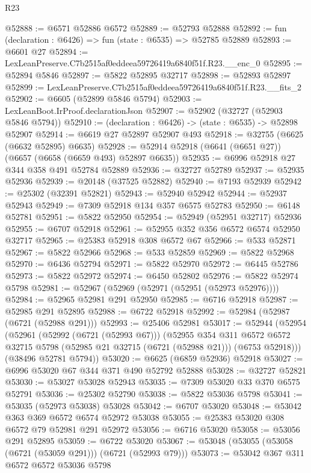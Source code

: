 \begin{lexlean}{R23}
\begin{coremodule}
@52888 := @6571 @52886 @6572
@52889 := @52793 @52888
@52892 := fun (declaration : @6426) => fun (state : @6535) => @52785 @52889
@52893 := @6601 @27
@52894 := LexLeanPreserve.C7b2515af0eddeea59726419a6840f51f.R23.__enc_0
@52895 := @52894 @5846
@52897 := @5822 @52895 @32717
@52898 := @52893 @52897
@52899 := LexLeanPreserve.C7b2515af0eddeea59726419a6840f51f.R23.__fits_2
@52902 := @6605 (@52899 @5846 @5794)
@52903 := LexLeanBoot.IrProof.declarationJson
@52907 := @52902 (@32727 (@52903 @5846 @5794))
@52910 := (declaration : @6426) -> (state : @6535) -> @52898 @52907
@52914 := @6619 @27 @52897 @52907 @493
@52918 := @32755 (@6625 (@6632 @52895) @6635)
@52928 := @52914 @52918 (@6641 (@6651 @27)) (@6657 (@6658 (@6659 @493) @52897 @6635))
@52935 := @6996 @52918 @27 @344 @358 @491 @52784 @52889
@52936 := @32727 @52789
@52937 := @52935 @52936
@52939 := @20148 (@37525 @52882)
@52940 := @7193 @52939
@52942 := @25302 (@32391 @52821)
@52943 := @52940 @52942
@52944 := @52937 @52943
@52949 := @7309 @52918 @134 @357 @6575 @52783
@52950 := @6148 @52781
@52951 := @5822 @52950
@52954 := @52949 (@52951 @32717) @52936
@52955 := @6707 @52918
@52961 := @52955 @352 @356 @6572 @6574 @52950 @32717
@52965 := @25383 @52918 @308 @6572 @67
@52966 := @533 @52871
@52967 := @5822 @52966
@52968 := @533 @52859
@52969 := @5822 @52968
@52970 := @6436 @52794
@52971 := @5822 @52970
@52972 := @6445 @52786
@52973 := @5822 @52972
@52974 := @6450 @52802
@52976 := @5822 @52974 @5798
@52981 := @52967 (@52969 (@52971 (@52951 (@52973 @52976))))
@52984 := @52965 @52981 @291 @52950
@52985 := @6716 @52918
@52987 := @52985 @291 @52895
@52988 := @6722 @52918
@52992 := @52984 (@52987 (@6721 (@52988 @291)))
@52993 := @25406 @52981
@53017 := @52944
    (@52954
      (@52961
        (@52992 (@6721 (@52993 @67)))
        (@52955
          @354
          @311
          @6572
          @6572
          @32715
          @5798
          (@52985 @21 @32715 (@6721 (@52988 @21)))
          (@6753 @52918)))
      (@38496 @52781 @5794))
@53020 := @6625 (@6859 @52936) @52918
@53027 := @6996 @53020 @67 @344 @371 @490 @52792 @52888
@53028 := @32727 @52821
@53030 := @53027 @53028 @52943
@53035 := @7309 @53020 @33 @370 @6575 @52791
@53036 := @25302 @52790
@53038 := @5822 @53036 @5798
@53041 := @53035 (@52973 @53038) @53028
@53042 := @6707 @53020
@53048 := @53042 @363 @369 @6572 @6574 @52972 @53038
@53055 := @25383 @53020 @308 @6572 @79 @52981 @291 @52972
@53056 := @6716 @53020
@53058 := @53056 @291 @52895
@53059 := @6722 @53020
@53067 := @53048 (@53055 (@53058 (@6721 (@53059 @291))) (@6721 (@52993 @79)))
@53073 := @53042 @367 @311 @6572 @6572 @53036 @5798

\end{coremodule}
\end{lexlean}
